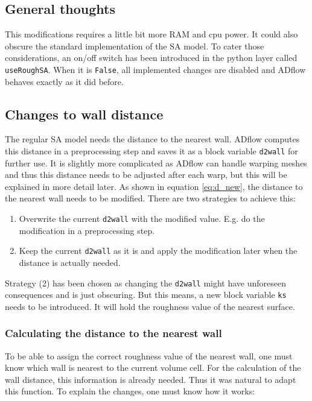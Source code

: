 \subsection{General thoughts}
This modifications requires a little bit more RAM and cpu power. It could also
obscure the standard implementation of the SA model. To cater those
considerations, an on/off switch has been introduced in the python layer called
\texttt{useRoughSA}. When it is \texttt{False}, all implemented changes are
disabled and ADflow behaves exactly as it did before.


\subsection{Changes to wall distance}
The regular SA model needs the distance to the nearest wall. ADflow computes
this distance in a preprocessing step and saves it as a block variable
\texttt{d2wall} for further use. It is slightly more complicated as ADflow can
handle warping meshes and thus this distance needs to be adjusted after each
warp, but this will be explained in more detail later. As shown in equation
\ref{eq:d_new}, the distance to the nearest wall needs to be modified. There are
two strategies to achieve this:

\begin{enumerate}
  \item Overwrite the current \texttt{d2wall} with the modified value. E.g. do
        the modification in a preprocessing step.
  \item Keep the current \texttt{d2wall} as it is and apply the modification
        later when the distance is actually needed.
\end{enumerate}

\noindent Strategy (2) has been chosen as changing the \texttt{d2wall} might
have unforeseen consequences and is just obscuring. But this means, a new block
variable \texttt{ks} needs to be introduced. It will hold the roughness value of
the nearest surface.

\subsubsection{Calculating the distance to the nearest wall}
To be able to assign the correct roughness value of the nearest wall, one must
know which wall is nearest to the current volume cell. For the calculation of
the wall distance, this information is already needed. Thus it was natural to
adapt this function. To explain the changes, one must know how it works:

